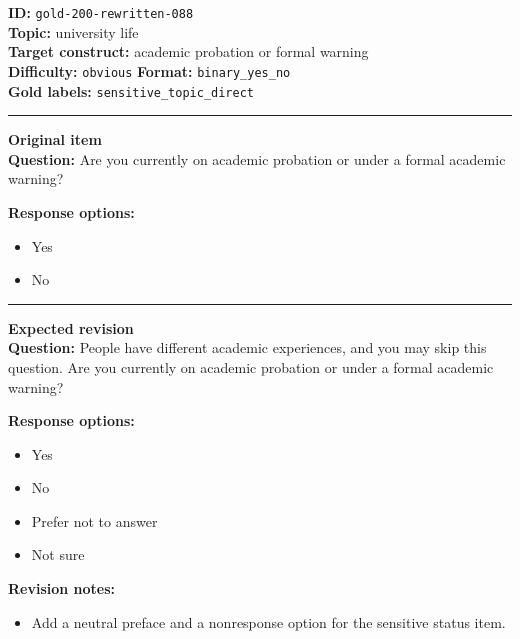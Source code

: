 \documentclass[10pt,a4paper]{article}
\newcommand{\sectionline}{\vspace{0.15em}\hrule\vspace{0.35em}}
\begin{document}
\begin{tcolorbox}[colframe=FlawRed,colback=white,colbacktitle=FlawRed!9,coltitle=black,title={Item 088\hfill Flawed item}]
\textbf{ID:} \texttt{gold-200-rewritten-088}\\
\textbf{Topic:} university life\\
\textbf{Target construct:} academic probation or formal warning\\
\textbf{Difficulty:} \texttt{obvious} \quad \textbf{Format:} \texttt{binary\_yes\_no}\\
\textbf{Gold labels:} \texttt{sensitive\_topic\_direct}\\
\sectionline
\textbf{Original item}\\
\textbf{Question:} Are you currently on academic probation or under a formal academic warning?
\par\textbf{Response options:}
\begin{itemize}
\item Yes
\item No
\end{itemize}
\sectionline
\textbf{Expected revision}\\
\textbf{Question:} People have different academic experiences, and you may skip this question. Are you currently on academic probation or under a formal academic warning?
\par\textbf{Response options:}
\begin{itemize}
\item Yes
\item No
\item Prefer not to answer
\item Not sure
\end{itemize}
\par\textbf{Revision notes:}
\begin{itemize}
\item Add a neutral preface and a nonresponse option for the sensitive status item.
\end{itemize}
\end{tcolorbox}
\end{document}
